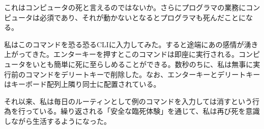 \documentclass[a4paper]{article}
\begin{document}
これはコンピュータの死と言えるのではないか。さらにプログラマの業務にコンピュータは必須であり、それが動かないとなるとプログラマも死んだことになる。

私はこのコマンドを恐る恐るCLIに入力してみた。すると途端にあの感情が湧き上がってきた。エンターキーを押すとこのコマンドは即座に実行される。コンピュータをいとも簡単に死に至らしめることができる。数秒のちに、私は無事に実行前のコマンドをデリートキーで削除した。なお、エンターキーとデリートキーはキーボード配列上隣り同士に配置されている。

それ以来、私は毎日のルーティンとして例のコマンドを入力しては消すという行為を行っている。繰り返される「安全な臨死体験」を通じて、私は再び死を意識しながら生活するようになった。
\end{document}
